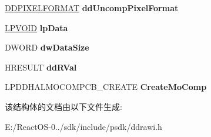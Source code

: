 \begin{DoxyCompactItemize}
\hyperlink{struct___d_d_p_i_x_e_l_f_o_r_m_a_t}{D\+D\+P\+I\+X\+E\+L\+F\+O\+R\+M\+AT} {\bfseries dd\+Uncomp\+Pixel\+Format}
\item 
\mbox{\label{struct___d_d_h_a_l___c_r_e_a_t_e_m_o_c_o_m_p_d_a_t_a_a0de164780dff2c43f867ed1573a3d04d}} 
\hyperlink{interfacevoid}{L\+P\+V\+O\+ID} {\bfseries lp\+Data}
\item 
\mbox{\label{struct___d_d_h_a_l___c_r_e_a_t_e_m_o_c_o_m_p_d_a_t_a_a85220d7400864c0cf9bf3b5457510d7f}} 
D\+W\+O\+RD {\bfseries dw\+Data\+Size}
\item 
\mbox{\label{struct___d_d_h_a_l___c_r_e_a_t_e_m_o_c_o_m_p_d_a_t_a_aefcdbcea3e33817f795bbcdba4cb2342}} 
H\+R\+E\+S\+U\+LT {\bfseries dd\+R\+Val}
\item 
\mbox{\label{struct___d_d_h_a_l___c_r_e_a_t_e_m_o_c_o_m_p_d_a_t_a_a3e9dbe54a339fbdf50162ce16117c121}} 
L\+P\+D\+D\+H\+A\+L\+M\+O\+C\+O\+M\+P\+C\+B\+\_\+\+C\+R\+E\+A\+TE {\bfseries Create\+Mo\+Comp}
\end{DoxyCompactItemize}


该结构体的文档由以下文件生成\+:\begin{DoxyCompactItemize}
\item 
E\+:/\+React\+O\+S-\/0../sdk/include/psdk/ddrawi.\+h\end{DoxyCompactItemize}
